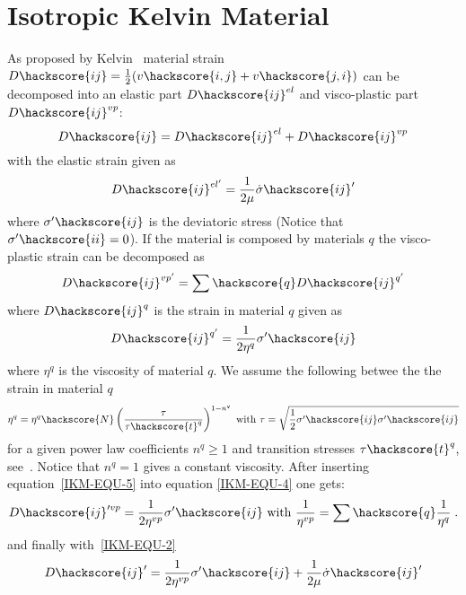 \section{Isotropic Kelvin Material \label{IKM}}
As proposed by Kelvin~\cite{Muhlhaus2005} material strain $D\hackscore{ij}=\frac{1}{2}(v\hackscore{i,j}+v\hackscore{j,i})$ can be decomposed into
an elastic part $D\hackscore{ij}^{el}$ and visco-plastic part $D\hackscore{ij}^{vp}$:
\begin{equation}\label{IKM-EQU-2}
D\hackscore{ij}=D\hackscore{ij}^{el}+D\hackscore{ij}^{vp}
\end{equation}
with the elastic strain given as 
\begin{equation}\label{IKM-EQU-3}
D\hackscore{ij}^{el'}=\frac{1}{2 \mu} \dot{\sigma}\hackscore{ij}'
\end{equation}
where $\sigma'\hackscore{ij}$ is the deviatoric stress (Notice that $\sigma'\hackscore{ii}=0$).
If the material is composed by materials $q$ the visco-plastic strain can be decomposed as
\begin{equation}\label{IKM-EQU-4}
D\hackscore{ij}^{vp'}=\sum\hackscore{q} D\hackscore{ij}^{q'} 
\end{equation}
where $D\hackscore{ij}^{q}$ is the strain in material $q$ given as 
\begin{equation}\label{IKM-EQU-5}
D\hackscore{ij}^{q'}=\frac{1}{2 \eta^{q}} \sigma'\hackscore{ij} 
\end{equation}
where $\eta^{q}$ is the viscosity of material $q$. We assume the following 
betwee the the strain in material $q$ 
\begin{equation}\label{IKM-EQU-5b}
\eta^{q}=\eta^{q}\hackscore{N} \left(\frac{\tau}{\tau\hackscore{t}^q}\right)^{1-n^{q}}
\mbox{ with } \tau=\sqrt{\frac{1}{2}\sigma'\hackscore{ij} \sigma'\hackscore{ij}}
\end{equation}
for a given power law coefficients $n^{q}\ge1$ and transition stresses $\tau\hackscore{t}^q$, see~\cite{Muhlhaus2005}.
Notice that $n^{q}=1$ gives a constant viscosity.
After inserting equation~\ref{IKM-EQU-5} into equation \ref{IKM-EQU-4} one gets:
\begin{equation}\label{IKM-EQU-6}
D\hackscore{ij}'^{vp}=\frac{1}{2 \eta^{vp}} \sigma'\hackscore{ij} \mbox{ with } \frac{1}{\eta^{vp}} = \sum\hackscore{q} \frac{1}{\eta^{q}} \;.
\end{equation}
and finally with~\ref{IKM-EQU-2} 
\begin{equation}\label{IKM-EQU-2bb}
D\hackscore{ij}'=\frac{1}{2 \eta^{vp}} \sigma'\hackscore{ij}+\frac{1}{2 \mu} \dot{\sigma}\hackscore{ij}'
\end{equation}
